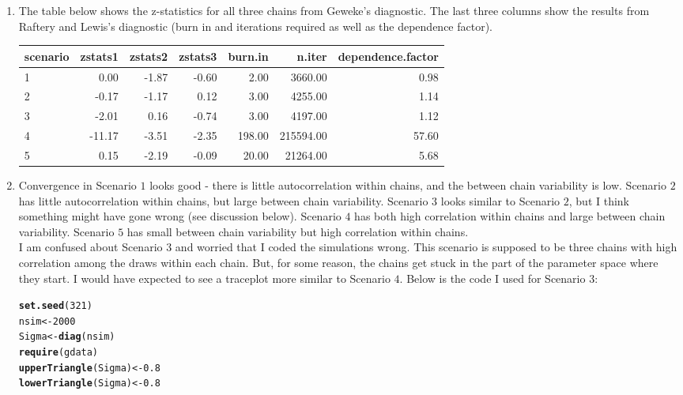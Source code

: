 \documentclass[12pt]{article}\usepackage[]{graphicx}\usepackage[]{color}
\makeatletter
\newcommand{\hlnum}[1]{\textcolor[rgb]{0.686,0.059,0.569}{#1}}%
\newcommand{\hlstd}[1]{\textcolor[rgb]{0.345,0.345,0.345}{#1}}%
\newcommand{\hlkwb}[1]{\textcolor[rgb]{0.69,0.353,0.396}{#1}}%
\newcommand{\hlkwd}[1]{\textcolor[rgb]{0.737,0.353,0.396}{\textbf{#1}}}%
\newenvironment{kframe}{%
 \def\at@end@of@kframe{}%
 \ifinner\ifhmode%
  \def\at@end@of@kframe{\end{minipage}}%
  \begin{minipage}{\columnwidth}%
 \fi\fi%
 \def\FrameCommand##1{\hskip\@totalleftmargin \hskip-\fboxsep
 \colorbox{shadecolor}{##1}\hskip-\fboxsep
     \hskip-\linewidth \hskip-\@totalleftmargin \hskip\columnwidth}%
 \MakeFramed {\advance\hsize-\width
   \@totalleftmargin\z@ \linewidth\hsize
   \@setminipage}}%
 {\par\unskip\endMakeFramed%
 \at@end@of@kframe}
\newenvironment{knitrout}{}{} %
\makeatother
\begin{document}
\begin{doublespacing}
\begin{enumerate}
\begin{enumerate}
\item The table below shows the z-statistics for all three chains from Geweke's diagnostic. The last three columns show the results from Raftery and Lewis's diagnostic (burn in and iterations required as well as the dependence factor).

\begin{table}[ht]
\centering
\begin{tabular}{lrrrrrr}
  \hline
scenario & zstats1 & zstats2 & zstats3 & burn.in & n.iter & dependence.factor \\ 
  \hline
1 & 0.00 & -1.87 & -0.60 & 2.00 & 3660.00 & 0.98 \\ 
  2 & -0.17 & -1.17 & 0.12 & 3.00 & 4255.00 & 1.14 \\ 
  3 & -2.01 & 0.16 & -0.74 & 3.00 & 4197.00 & 1.12 \\ 
  4 & -11.17 & -3.51 & -2.35 & 198.00 & 215594.00 & 57.60 \\ 
  5 & 0.15 & -2.19 & -0.09 & 20.00 & 21264.00 & 5.68 \\ 
   \hline
\end{tabular}
\end{table}


\item Convergence in Scenario $1$ looks good - there is little autocorrelation within chains, and the between chain variability is low. Scenario $2$ has little autocorrelation within chains, but large between chain variability. Scenario $3$ looks similar to Scenario $2$, but I think something might have gone wrong (see discussion below). Scenario $4$ has both high correlation within chains and large between chain variability. Scenario $5$ has small between chain variability but high correlation within chains. \\

I am confused about Scenario $3$ and worried that I coded the simulations wrong. This scenario is supposed to be three chains with high correlation among the draws within each chain. But, for some reason, the chains get stuck in the part of the parameter space where they start. I would have expected to see a traceplot more similar to Scenario $4$. Below is the code I used for Scenario $3$:
\begin{singlespace}
\begin{knitrout}\footnotesize
{}\color{fgcolor}\begin{kframe}
\begin{alltt}
\hlkwd{set.seed}\hlstd{(}\hlnum{321}\hlstd{)}
\hlstd{nsim} \hlkwb{<-} \hlnum{2000}
\hlstd{Sigma} \hlkwb{<-} \hlkwd{diag}\hlstd{(nsim)}
\hlkwd{require}\hlstd{(gdata)}
\hlkwd{upperTriangle}\hlstd{(Sigma)} \hlkwb{<-} \hlnum{0.8}
\hlkwd{lowerTriangle}\hlstd{(Sigma)} \hlkwb{<-} \hlnum{0.8}


\end{alltt}
\end{kframe}
\end{knitrout}
\end{singlespace}
\end{enumerate}
\end{enumerate}
\end{doublespacing}
\end{document}
